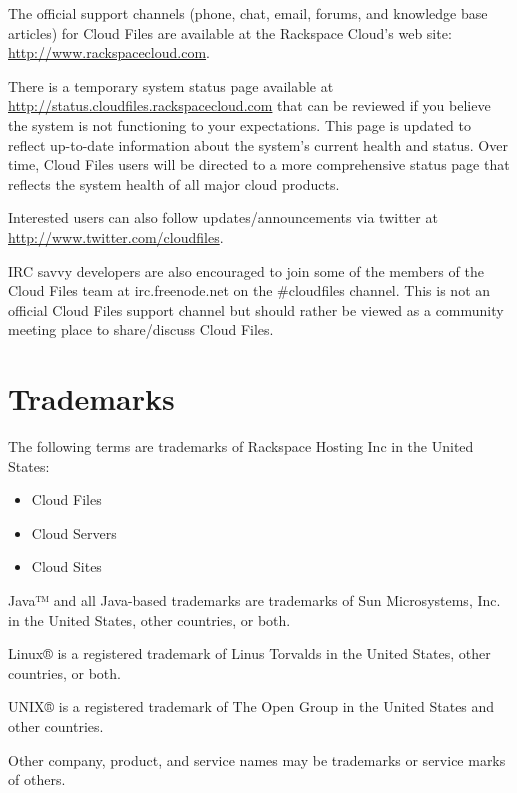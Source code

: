 \documentclass[letterpaper,10pt,english]{manual}
\begin{document}
The official support channels (phone, chat, email, forums, and knowledge
base articles) for Cloud Files are available at the Rackspace Cloud’s web
site: \href{http://www.rackspacecloud.com}{http://www.rackspacecloud.com}.

There is a temporary system status page available at
\href{http://status.cloudfiles.rackspacecloud.com}{http://status.cloudfiles.rackspacecloud.com} that can be reviewed if you
believe the system is not functioning to your expectations. This page
is updated to reflect up-to-date information about the system's current
health and status.  Over time, Cloud Files users will be directed to a
more comprehensive status page that reflects the system health of all
major cloud products.

Interested users can also follow updates/announcements via twitter at
\href{http://www.twitter.com/cloudfiles}{http://www.twitter.com/cloudfiles}.

IRC savvy developers are also encouraged to join some of the members of
the Cloud Files team at irc.freenode.net on the \#cloudfiles channel.
This is not an official Cloud Files support channel but should rather be
viewed as a community meeting place to share/discuss Cloud Files.


\chapter{Trademarks}

The following terms are trademarks of Rackspace Hosting Inc in the
United States:
\begin{itemize}
\item {} 
Cloud Files

\item {} 
Cloud Servers

\item {} 
Cloud Sites

\end{itemize}

Java™ and all Java-based trademarks are trademarks of Sun Microsystems,
Inc. in the United States, other countries, or both.

Linux® is a registered trademark of Linus Torvalds in the United States,
other countries, or both.

UNIX® is a registered trademark of The Open Group in the United States
and other countries.

Other company, product, and service names may be trademarks or service marks of others.


\renewcommand{\indexname}{Module Index}

\renewcommand{\indexname}{Index}
\printindex
\end{document}
